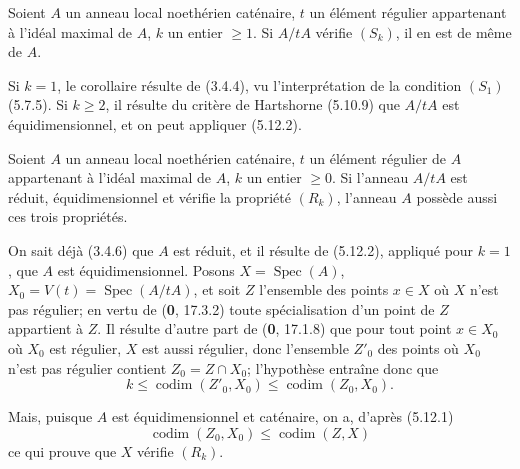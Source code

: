 \begin{corollary}[5.12.4]
\label{IV.2.s5.12.4-fr}
Soient $A$ un anneau local noethérien caténaire, $t$ un élément régulier
appartenant à l'idéal maximal de $A$, $k$ un entier $\geq1$. Si $A/tA$
vérifie $(S_k)$, il en est de même de $A$.
\end{corollary}

Si $k=1$, le corollaire résulte de (3.4.4), vu l'interprétation de la condition
$(S_1)$ (5.7.5). Si $k\geq2$, il résulte du critère de Hartshorne (5.10.9) que
$A/tA$ est équidimensionnel, et on peut appliquer (5.12.2).

\begin{proposition}[5.12.5]
\label{IV.2.s5.12.5-fr}
Soient $A$ un anneau local noethérien caténaire, $t$ un élément régulier de $A$
appartenant à l'idéal maximal de $A$, $k$ un entier $\geq0$. Si l'anneau
$A/tA$ est réduit, équidimensionnel et vérifie la propriété $(R_k)$, l'anneau
$A$ possède aussi ces trois propriétés.
\end{proposition}

On sait déjà (3.4.6) que $A$ est réduit, et il résulte de (5.12.2), appliqué
pour $k=1$, que $A$ est équidimensionnel. Posons
$X=\operatorname{Spec}(A)$, $X_0=V(t)=\operatorname{Spec}(A/tA)$, et soit $Z$
l'ensemble des points $x\in X$ où $X$ n'est pas régulier; en vertu de (\textbf{0},
17.3.2) toute spécialisation d'un point de $Z$ appartient à $Z$. Il résulte
d'autre part de (\textbf{0}, 17.1.8) que pour tout point $x\in X_0$ où $X_0$ est
régulier, $X$ est aussi régulier, donc l'ensemble $Z'_0$ des points où $X_0$
n'est pas régulier contient $Z_0=Z\cap X_0$; l'hypothèse entraîne donc que
\[
k\leq\operatorname{codim}(Z'_0,X_0)\leq\operatorname{codim}(Z_0,X_0).
\]

Mais, puisque $A$ est équidimensionnel et caténaire, on a, d'après (5.12.1)
\[
\operatorname{codim}(Z_0,X_0)\leq\operatorname{codim}(Z,X)
\]
ce qui prouve que $X$ vérifie $(R_k)$.

